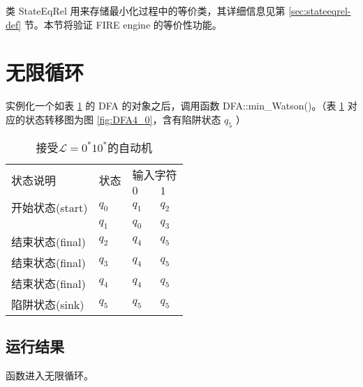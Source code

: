 类 StateEqRel 用来存储最小化过程中的等价类，其详细信息见第 \ref{sec:stateeqrel-def} 节。本节将验证 FIRE engine 的等价性功能。








\section{无限循环}\label{sec:ohloop}

实例化一个如表 \ref{tab:DFA4} 的 DFA 的对象之后，调用函数 DFA::min\_Watson()。（表 \ref{tab:DFA4} 对应的状态转移图为图 \ref{fig:DFA4_0}，含有陷阱状态 $q_5$ ）

\begin{table}[!htbp]
    \caption{接受{$\mathcal{L}=0^*10^*$}的自动机{\cite{book1}}}
    \label{tab:DFA4}
    \centering
    \small%
    \setlength{\tabcolsep}{4pt}%
    \renewcommand{\arraystretch}{1.2}%
        \begin{tabular}{l p{3em}<{\centering} p{3em}<{\centering} p{3em}<{\centering}}
        \toprule %
        \multirow{2}{*}{状态说明} & \multirow{2}{*}{状态} & \multicolumn{2}{c}{输入字符} \\
		\cline{3-4}      &    &$0$ & $1$  \\
        \midrule%
        开始状态(start)  & $q_0$ & $q_1$   & $q_2$   \\
                        & $q_1$ & $q_0$   & $q_3$   \\
        结束状态(final) & $q_2$ & $q_4$   & $q_5$   \\
        结束状态(final) & $q_3$ & $q_4$   & $q_5$   \\
        结束状态(final) & $q_4$ & $q_4$   & $q_5$   \\
        陷阱状态(sink) & $q_5$ & $q_5$   & $q_5$   \\
        \bottomrule%
    \end{tabular}
\end{table}

\subsection{运行结果}
函数进入无限循环。

